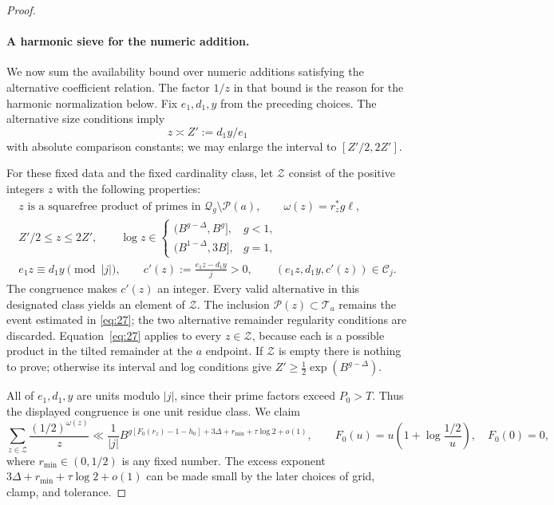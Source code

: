 \begin{proof}
\paragraph{A harmonic sieve for the numeric addition.}
We now sum the availability bound over numeric additions satisfying
the alternative coefficient relation. The factor $1/z$ in that bound
is the reason for the harmonic normalization below.
Fix $e_1,d_1,y$ from the preceding choices. The alternative size
conditions imply
\[
 z\asymp Z':=d_1y/e_1
\]
with absolute comparison constants; we may enlarge the interval to
$[Z'/2,2Z']$.

For these fixed data and the fixed cardinality class, let
$\mathcal Z$ consist of the positive integers $z$ with the following
properties:
\[
\begin{gathered}
 z\text{ is a squarefree product of primes in }
       \mathcal Q_g\setminus\mathcal P(a),\qquad
 \omega(z)=r_z^*g\ell,\\
 Z'/2\le z\le2Z',\qquad
 \log z\in
 \begin{cases}
 (B^{g-\Delta},B^g],&g<1,\\
 (B^{1-\Delta},3B],&g=1,
 \end{cases}\\
 e_1z\equiv d_1y\pmod{|j|},\qquad
 c'(z):=\frac{e_1z-d_1y}{j}>0,\qquad
 (e_1z,d_1y,c'(z))\in\mathcal C_j .
\end{gathered}
\]
The congruence makes $c'(z)$ an integer. Every valid alternative in
this designated class yields an element of $\mathcal Z$. The inclusion
$\mathcal P(z)\subset\mathcal T_a$ remains the event estimated in
\eqref{eq:27}; the two alternative remainder regularity conditions
are discarded. Equation~\eqref{eq:27} applies to every
$z\in\mathcal Z$, because each is a possible product in the tilted
remainder at the $a$ endpoint. If $\mathcal Z$ is empty there is nothing
to prove; otherwise its interval and log conditions give
$Z'\ge\tfrac12\exp(B^{g-\Delta})$.

All of $e_1,d_1,y$ are units modulo $|j|$, since their prime factors
exceed $P_0>T$. Thus the displayed congruence is one unit residue class.
We claim
\begin{equation}
 \sum_{z\in\mathcal Z}\frac{(1/2)^{\omega(z)}}{z}
 \ll\frac1{|j|}
 B^{g[F_0(r_z)-1-h_0]+3\Delta+r_{\min}+\tau\log2+o(1)},
 \qquad
 F_0(u)=u\left(1+\log\frac{1/2}{u}\right),\quad F_0(0)=0,
 \label{eq:28}
\end{equation}
where $r_{\min}\in(0,1/2)$ is any fixed number. The excess exponent
$3\Delta+r_{\min}+\tau\log2+o(1)$ can be made small by the later choices
of grid, clamp, and tolerance.


\end{proof}
